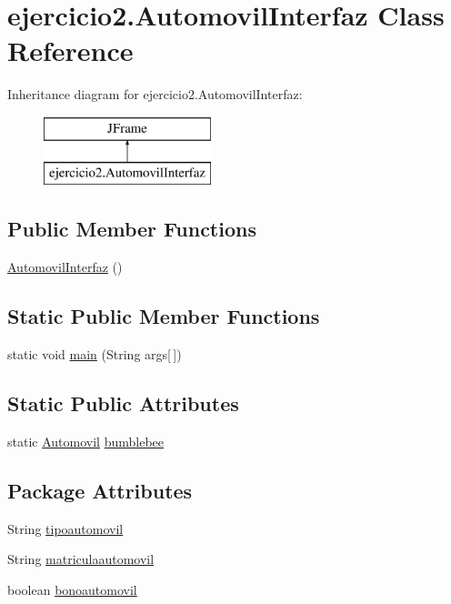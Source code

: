 \hypertarget{classejercicio2_1_1_automovil_interfaz}{}\section{ejercicio2.\+Automovil\+Interfaz Class Reference}
\label{classejercicio2_1_1_automovil_interfaz}
Inheritance diagram for ejercicio2.\+Automovil\+Interfaz\+:\begin{figure}[H]
\begin{center}
\leavevmode
\includegraphics[height=2.000000cm]{classejercicio2_1_1_automovil_interfaz}
\end{center}
\end{figure}
\subsection*{Public Member Functions}
\begin{DoxyCompactItemize}
\item 
\mbox{\hyperlink{classejercicio2_1_1_automovil_interfaz_a0ebeee030ec43693c371da3b68222644}{Automovil\+Interfaz}} ()
\end{DoxyCompactItemize}
\subsection*{Static Public Member Functions}
\begin{DoxyCompactItemize}
\item 
static void \mbox{\hyperlink{classejercicio2_1_1_automovil_interfaz_a43fe7b51e7afb9b0d0d513fb72f35ee3}{main}} (String args\mbox{[}$\,$\mbox{]})
\end{DoxyCompactItemize}
\subsection*{Static Public Attributes}
\begin{DoxyCompactItemize}
\item 
static \mbox{\hyperlink{classejercicio2_1_1_automovil}{Automovil}} \mbox{\hyperlink{classejercicio2_1_1_automovil_interfaz_a3ef1155acaf49db6e36883797090f677}{bumblebee}}
\end{DoxyCompactItemize}
\subsection*{Package Attributes}
\begin{DoxyCompactItemize}
\item 
String \mbox{\hyperlink{classejercicio2_1_1_automovil_interfaz_ae53ea3336ded07ff47311d4e6d56cdb7}{tipoautomovil}}
\item 
String \mbox{\hyperlink{classejercicio2_1_1_automovil_interfaz_ac2b5205bae6f78acbcc8e55d34cf8e21}{matriculaautomovil}}
\item 
boolean \mbox{\hyperlink{classejercicio2_1_1_automovil_interfaz_a3d93aa54c482a013e91c862171f66bac}{bonoautomovil}}
\end{DoxyCompactItemize}
